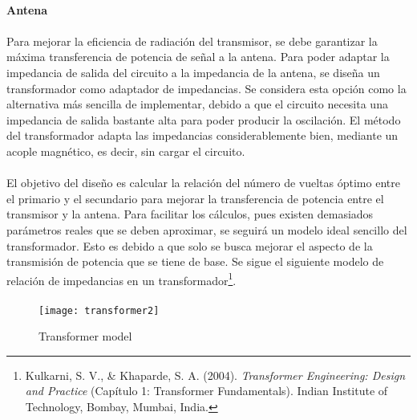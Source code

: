 \paragraph{Antena} 
\paragraph{}
Para mejorar la eficiencia de radiación del transmisor, se debe garantizar la máxima transferencia de potencia de señal a la antena.
Para poder adaptar la impedancia de salida del circuito a la impedancia de la antena, se diseña un transformador como adaptador de impedancias. 
Se considera esta opción como la alternativa más sencilla de implementar, debido a que el circuito necesita una impedancia de salida bastante alta para poder producir la oscilación.
El método del transformador adapta las impedancias considerablemente bien, mediante un acople magnético, es decir, sin cargar el circuito.
\paragraph{}
El objetivo del diseño es calcular la relación del número de vueltas óptimo entre el primario y el secundario para mejorar la transferencia de potencia entre el transmisor y la antena. 
Para facilitar los cálculos, pues existen demasiados parámetros reales que se deben aproximar, se seguirá un modelo ideal sencillo del transformador. Esto es debido a que solo se busca mejorar el aspecto de la transmisión de potencia que se tiene de base.
Se sigue el siguiente modelo de relación de impedancias en un transformador\footnote{Kulkarni, S. V., \& Khaparde, S. A. (2004). \textit{Transformer Engineering: Design and Practice} (Capítulo 1: Transformer Fundamentals). Indian Institute of Technology, Bombay, Mumbai, India.}.

\paragraph{}
\begin{figure}[h!]
    \centering
    \texttt{[image: transformer2]}
    \caption{Transformer model}
    \label{fig:transformer}
\end{figure}
